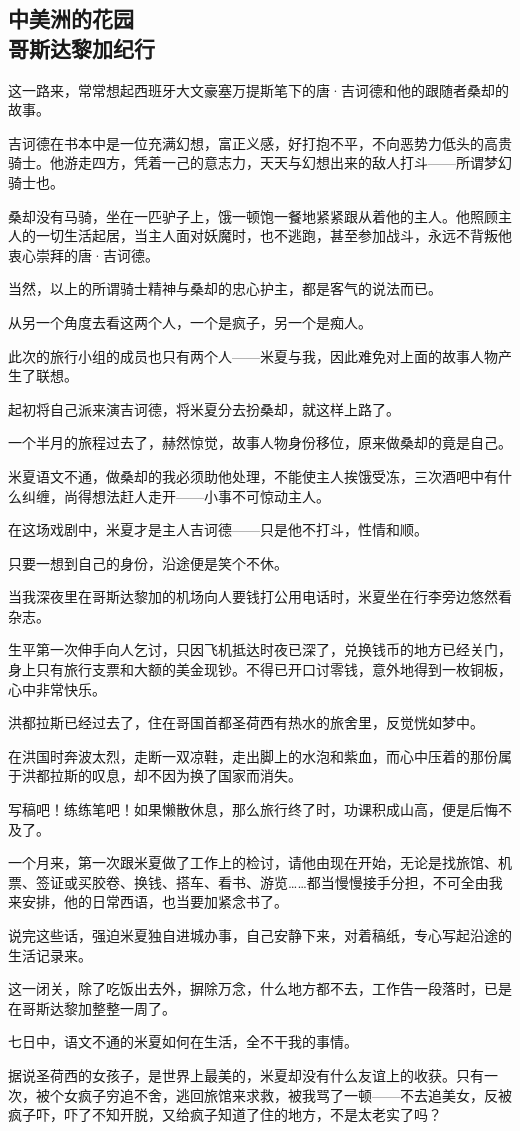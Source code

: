 \subsection{中美洲的花园\\\small{哥斯达黎加纪行}}

\par 这一路来，常常想起西班牙大文豪塞万提斯笔下的唐·吉诃德和他的跟随者桑却的故事。
\par 吉诃德在书本中是一位充满幻想，富正义感，好打抱不平，不向恶势力低头的高贵骑士。他游走四方，凭着一己的意志力，天天与幻想出来的敌人打斗——所谓梦幻骑士也。
\par 桑却没有马骑，坐在一匹驴子上，饿一顿饱一餐地紧紧跟从着他的主人。他照顾主人的一切生活起居，当主人面对妖魔时，也不逃跑，甚至参加战斗，永远不背叛他衷心崇拜的唐·吉诃德。
\par 当然，以上的所谓骑士精神与桑却的忠心护主，都是客气的说法而已。
\par 从另一个角度去看这两个人，一个是疯子，另一个是痴人。
\par 此次的旅行小组的成员也只有两个人——米夏与我，因此难免对上面的故事人物产生了联想。
\par 起初将自己派来演吉诃德，将米夏分去扮桑却，就这样上路了。
\par 一个半月的旅程过去了，赫然惊觉，故事人物身份移位，原来做桑却的竟是自己。
\par 米夏语文不通，做桑却的我必须助他处理，不能使主人挨饿受冻，三次酒吧中有什么纠缠，尚得想法赶人走开——小事不可惊动主人。
\par 在这场戏剧中，米夏才是主人吉诃德——只是他不打斗，性情和顺。
\par 只要一想到自己的身份，沿途便是笑个不休。
\par 当我深夜里在哥斯达黎加的机场向人要钱打公用电话时，米夏坐在行李旁边悠然看杂志。
\par 生平第一次伸手向人乞讨，只因飞机抵达时夜已深了，兑换钱币的地方已经关门，身上只有旅行支票和大额的美金现钞。不得已开口讨零钱，意外地得到一枚铜板，心中非常快乐。
\par 洪都拉斯已经过去了，住在哥国首都圣荷西有热水的旅舍里，反觉恍如梦中。
\par 在洪国时奔波太烈，走断一双凉鞋，走出脚上的水泡和紫血，而心中压着的那份属于洪都拉斯的叹息，却不因为换了国家而消失。
\par 写稿吧！练练笔吧！如果懒散休息，那么旅行终了时，功课积成山高，便是后悔不及了。
\par 一个月来，第一次跟米夏做了工作上的检讨，请他由现在开始，无论是找旅馆、机票、签证或买胶卷、换钱、搭车、看书、游览……都当慢慢接手分担，不可全由我来安排，他的日常西语，也当要加紧念书了。
\par 说完这些话，强迫米夏独自进城办事，自己安静下来，对着稿纸，专心写起沿途的生活记录来。
\par 这一闭关，除了吃饭出去外，摒除万念，什么地方都不去，工作告一段落时，已是在哥斯达黎加整整一周了。
\par 七日中，语文不通的米夏如何在生活，全不干我的事情。
\par 据说圣荷西的女孩子，是世界上最美的，米夏却没有什么友谊上的收获。只有一次，被个女疯子穷追不舍，逃回旅馆来求救，被我骂了一顿——不去追美女，反被疯子吓，吓了不知开脱，又给疯子知道了住的地方，不是太老实了吗？
